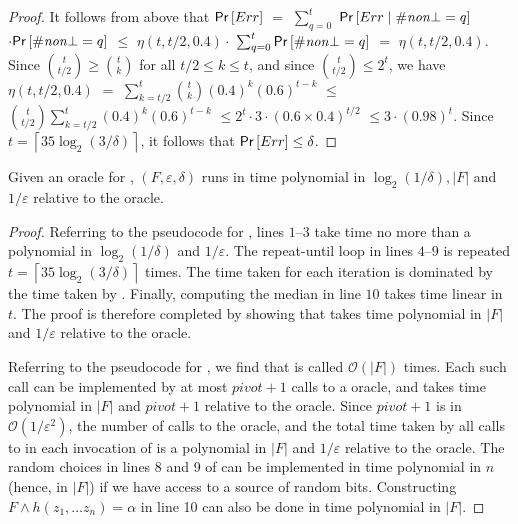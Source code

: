 \begin{proof}
It follows from above that $\mathsf{Pr}\left[ Err \right]$ $=$
$\sum_{q=0}^t$ $\mathsf{Pr}\left[Err \mid \#\mathit{non }\bot = q\right]$
$\cdot\mathsf{Pr}\left[\#\mathit{non }\bot = q\right]$ $\le$ $\eta(t, t/2,
0.4)\cdot$ $\sum_{q=0}^t \mathsf{Pr}\left[\#\mathit{non }\bot = q\right]$
$=$ $\eta(t, t/2, 0.4)$.  Since $\binom{t}{t/2} \ge \binom{t}{k}$ for
all $t/2 \le k \le t$, and since $\binom{t}{t/2} \le 2^t$, we have
$\eta(t, t/2, 0.4)$ $=$ $\sum_{k=t/2}^{t} \binom{t}{k} (0.4)^{k}
(0.6)^{t-k}$ $\le$ $\binom{t}{t/2} \sum_{k=t/2}^t (0.4)^k (0.6)^{t-k}$
$\le 2^t \cdot 3 \cdot (0.6 \times 0.4)^{t/2}$ $\le 3\cdot(0.98)^t$.
Since $t = \left\lceil 35\log_2 (3/\delta) \right\rceil$, it follows
that $\mathsf{Pr}\left[Err\right] \le \delta$.
\end{proof}

%
%
%
\begin{theorem} \label{th:complexity}
Given an oracle for {\SAT}, {\ApproxMC}$(F, \varepsilon, \delta)$
%
%
runs in time polynomial in $\log_2(1/\delta), |F|$ and
$1/\varepsilon$ relative to the oracle.
%
%
\end{theorem}
\begin{proof}
Referring to the pseudocode for {\ApproxMC}, lines $1$--$3$ take time
no more than a polynomial in $\log_2(1/\delta)$ and $1/\varepsilon$.
The repeat-until loop in lines $4$--$9$ is repeated $t = \left\lceil
35\log_2(3/\delta)\right\rceil$ times. The time taken for each
iteration is dominated by the time taken by {\ApproxMCCore}.  Finally,
computing the median in line $10$ takes time linear in $t$.  The proof
is therefore completed by showing that {\ApproxMCCore} takes time
polynomial in $|F|$ and $1/\varepsilon$ relative to the {\SAT} oracle.

Referring to the pseudocode for {\ApproxMCCore}, we find that
{\BoundedSAT} is called $\mathcal{O}(|F|)$ times.  Each such call can
be implemented by at most $\mathit{pivot}+1$ calls to a {\SAT} oracle,
and takes time polynomial in $|F|$ and $\mathit{pivot}+1$ relative to
the oracle.  Since $\mathit{pivot}+1$ is in
$\mathcal{O}(1/\varepsilon^2)$, the number of calls to the {\SAT}
oracle, and the total time taken by all calls to {\BoundedSAT} in each
invocation of {\ApproxMCCore} is a polynomial in $|F|$ and
$1/\varepsilon$ relative to the oracle.  The random choices in lines 8
and 9 of {\ApproxMCCore} can be implemented in time polynomial in $n$
(hence, in $|F|$) if we have access to a source of random bits.
Constructing $F \wedge h(z_1, \ldots z_n) = \alpha$ in line 10 can
also be done in time polynomial in $|F|$.
%
%
\end{proof}
